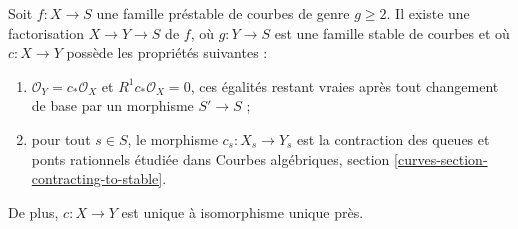 \begin{lemma}
\label{lemma-contract-prestable-to-stable}
Soit $f : X \to S$ une famille préstable de courbes de genre $g \geq 2$.
Il existe une factorisation $X \to Y \to S$ de $f$, où $g : Y \to S$
est une famille stable de courbes et où $c : X \to Y$ possède les propriétés
suivantes :
\begin{enumerate}
\item $\mathcal{O}_Y = c_*\mathcal{O}_X$ et $R^1c_*\mathcal{O}_X = 0$,
ces égalités restant vraies après tout changement de base par un morphisme $S' \to S$ ;
\item pour tout $s \in S$, le morphisme $c_s : X_s \to Y_s$ est la
contraction des queues et ponts rationnels étudiée dans
Courbes algébriques, section \ref{curves-section-contracting-to-stable}.
\end{enumerate}
De plus, $c : X \to Y$ est unique à isomorphisme unique près.
\end{lemma}

